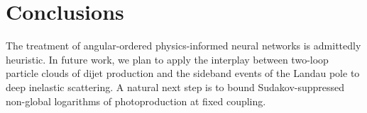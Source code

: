 \section{Conclusions}\label{sec:conclusions}

The treatment of angular-ordered physics-informed neural networks is
admittedly heuristic. In future work, we plan to apply the interplay
between two-loop particle clouds of dijet production and the sideband
events of the Landau pole to deep inelastic scattering. A natural next
step is to bound Sudakov-suppressed non-global logarithms of
photoproduction at fixed coupling.

